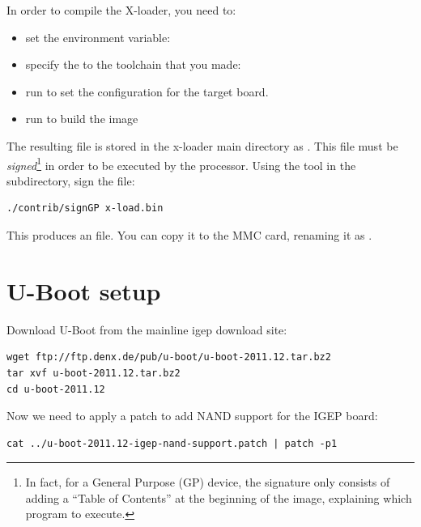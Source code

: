 In order to compile the X-loader, you need to:
\begin{itemize}

\item set the  environment variable:\\

\item specify the  to the toolchain that you made:\\

\item run  to set the configuration
  for the target board.

\item run  to build the image

\end{itemize}

The resulting file is stored in the x-loader main directory as
. This file must be {\em signed}\footnote{In fact,
  for a General Purpose (GP) device, the signature only consists of
  adding a “Table of Contents” at the beginning of the image,
  explaining which program to execute.} in order to be executed by the
processor. Using the  tool in the 
subdirectory, sign the  file:

\begin{verbatim}
./contrib/signGP x-load.bin
\end{verbatim}

This produces an  file. You can copy it to the
MMC card, renaming it as .

\section{U-Boot setup}

Download U-Boot from the mainline igep download site:

\begin{verbatim}
wget ftp://ftp.denx.de/pub/u-boot/u-boot-2011.12.tar.bz2
tar xvf u-boot-2011.12.tar.bz2
cd u-boot-2011.12
\end{verbatim}

Now we need to apply a patch to add NAND support for the IGEP board:

\begin{verbatim}
cat ../u-boot-2011.12-igep-nand-support.patch | patch -p1
\end{verbatim}

